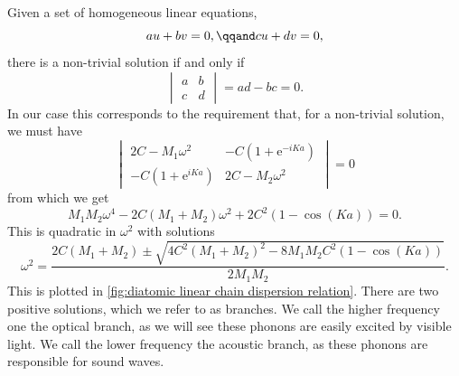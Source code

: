 \documentclass[fleqn]{NotesClass}
\newcommand*{\e}{\mathrm{e}}
\begin{document}
    Given a set of homogeneous linear equations,
    \begin{equation}
        a u + b v = 0, \qqand cu + dv = 0,
    \end{equation}
    there is a non-trivial solution if and only if
    \begin{equation}
        \begin{vmatrix}
            a & b\\
            c & d
        \end{vmatrix}
        = ad - bc = 0.
    \end{equation}
    In our case this corresponds to the requirement that, for a non-trivial solution, we must have
    \begin{equation}
        \begin{vmatrix}
            2C - M_1\omega^2 & -C(1 + \e^{-iKa})\\
            -C(1 + \e^{iKa}) & 2C - M_2\omega^2
        \end{vmatrix}
        = 0
    \end{equation}
    from which we get
    \begin{equation}
        M_1M_2\omega^4 - 2C(M_1 + M_2)\omega^2 + 2C^2(1 - \cos(Ka)) = 0.
    \end{equation}
    This is quadratic in \(\omega^2\) with solutions
    \begin{equation}
        \omega^2 = \frac{2C(M_1 + M_2) \pm \sqrt{4C^2(M_1 + M_2)^2 - 8M_1M_2C^2(1 - \cos(Ka))}}{2M_1M_2}.
    \end{equation}
    This is plotted in \cref{fig:diatomic linear chain dispersion relation}.
    There are two positive solutions, which we refer to as branches.
    We call the higher frequency one the optical branch, as we will see these phonons are easily excited by visible light.
    We call the lower frequency the acoustic branch, as these phonons are responsible for sound waves.
    
\end{document}
